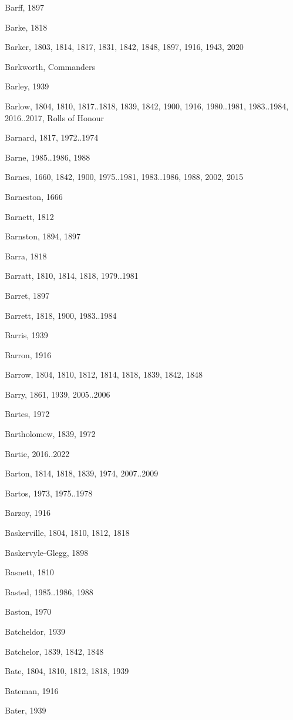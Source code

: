 {\begin{theindex}
\item Barff, 1897
\item Barke, 1818
\item Barker, 1803, 1814, 1817, 1831, 1842, 1848, 1897, 1916, 1943, 2020
\item Barkworth, Commanders
\item Barley, 1939
\item Barlow, 1804, 1810, 1817..1818, 1839, 1842, 1900, 1916, 1980..1981, 1983..1984, 2016..2017, Rolls of Honour
\item Barnard, 1817, 1972..1974
\item Barne, 1985..1986, 1988
\item Barnes, 1660, 1842, 1900, 1975..1981, 1983..1986, 1988, 2002, 2015
\item Barneston, 1666
\item Barnett, 1812
\item Barnston, 1894, 1897
\item Barra, 1818
\item Barratt, 1810, 1814, 1818, 1979..1981
\item Barret, 1897
\item Barrett, 1818, 1900, 1983..1984
\item Barris, 1939
\item Barron, 1916
\item Barrow, 1804, 1810, 1812, 1814, 1818, 1839, 1842, 1848
\item Barry, 1861, 1939, 2005..2006
\item Bartes, 1972
\item Bartholomew, 1839, 1972
\item Bartie, 2016..2022
\item Barton, 1814, 1818, 1839, 1974, 2007..2009
\item Bartos, 1973, 1975..1978
\item Barzoy, 1916
\item Baskerville, 1804, 1810, 1812, 1818
\item Baskervyle-Glegg, 1898
\item Basnett, 1810
\item Basted, 1985..1986, 1988
\item Baston, 1970
\item Batcheldor, 1939
\item Batchelor, 1839, 1842, 1848
\item Bate, 1804, 1810, 1812, 1818, 1939
\item Bateman, 1916
\item Bater, 1939

\end{theindex}}
